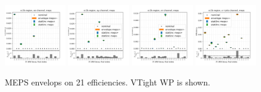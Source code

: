 \begin{figure}
    \includegraphics[width=0.24\textwidth]{chapters/Appendix/sectionTTSyst/figures/afterCorr/icata3_ch0_meps.png}
    \includegraphics[width=0.24\textwidth]{chapters/Appendix/sectionTTSyst/figures/afterCorr/icata3_ch1_meps.png}
    \includegraphics[width=0.24\textwidth]{chapters/Appendix/sectionTTSyst/figures/afterCorr/icata3_ch2_meps.png}
    \includegraphics[width=0.24\textwidth]{chapters/Appendix/sectionTTSyst/figures/afterCorr/icata3_ch3_meps.png}
    
    \caption{MEPS envelops on 21 efficiencies. VTight WP is shown.}
    \label{fig:appendix:reweighttt:effAfterCorrMEPS}
\end{figure}


